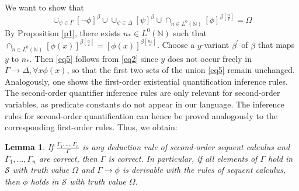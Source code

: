 \documentclass{jloganal}
\numberwithin{equation}{section}
\theoremstyle{plain}
\newtheorem{lemma}[subsection]{Lemma}
\begin{document}
We want to show that 
\begin{equation}\label{eq5}
\cup_{\psi\in \Gamma} [\neg \phi]^{\beta} \cup \cup_{\psi\in \Delta} [\psi]^{\beta}\cup \cap_{n\in L^0(\mathbb{N})}[\phi]^{\beta[\frac{n}{x}]}=\Omega
\end{equation}
By Proposition \ref{p1}, there exists $n_\ast\in L^0(\mathbb{N})$ such that $\cap_{n\in L^0(\mathbb{N})}[\phi(x)]^{\beta[\frac{n}{x}]}=[\phi(x)]^{\beta[\frac{n_\ast}{x}]}$. 
Choose a $y$-variant $\beta^{\prime}$ of $\beta$ that maps $y$ to $n_\ast$. 
Then \eqref{eq5} follows from \eqref{eq2} since $y$ does not occur freely in $\Gamma\rightarrow\Delta,\forall{x}\phi(x)$, so that the first two sets of the union \eqref{eq5} remain unchanged.  
Analogously, one shows the first-order existential quantification inference rules. 
The second-order quantifier inference rules are only relevant for second-order variables, as predicate constants do not appear in our language.
The inference rules for second-order quantification can hence be proved analogously to the corresponding first-order rules.    
Thus, we obtain:

\begin{lemma}{\label{deduction}}
If $\frac{\Gamma_{1},...,\Gamma_{n}}{\Gamma}$ is any deduction rule of second-order sequent calculus and $\Gamma_{1},...,\Gamma_{n}$ are correct, then $\Gamma$ is correct.
In particular, if all elements of $\Gamma$ hold in $\mathcal{S}$ with truth value $\Omega$ and $\Gamma\rightarrow\phi$ is derivable with the rules of sequent calculus,
then $\phi$ holds in $\mathcal{S}$ with truth value $\Omega$.
\end{lemma}
\end{document}
